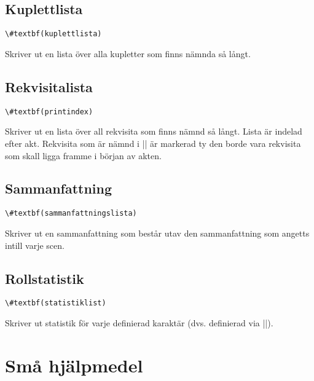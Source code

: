 \documentclass{article}
\begin{document}
\subsection{Kuplettlista}
\begin{Verbatim}[commentchar=!, commandchars=\#\(\),numberblanklines=false]
\#textbf(kuplettlista) 
\end{Verbatim}
Skriver ut en lista över alla kupletter som finns nämnda så långt.

\subsection{Rekvisitalista}\label{uSakregister}
\begin{Verbatim}[commentchar=!, commandchars=\#\(\),numberblanklines=false]
\#textbf(printindex) 
\end{Verbatim}
Skriver ut en lista över all rekvisita som finns nämnd så långt. Lista är indelad efter akt. Rekvisita som är nämnd i |\berattare| är markerad ty den borde vara rekvisita som skall ligga framme i början av akten.

\subsection{Sammanfattning}\label{uSammanfattning}
\begin{Verbatim}[commentchar=!, commandchars=\#\(\),numberblanklines=false]
\#textbf(sammanfattningslista) 
\end{Verbatim}

Skriver ut en sammanfattning som består utav den sammanfattning som angetts intill varje scen.

\subsection{Rollstatistik}\label{uRollstatistik}
\begin{Verbatim}[commentchar=!, commandchars=\#\(\),numberblanklines=false]
\#textbf(statistiklist) 
\end{Verbatim}

Skriver ut statistik för varje definierad karaktär (dvs. definierad via |\nyroll|).

\section{Små hjälpmedel}
\end{document}
